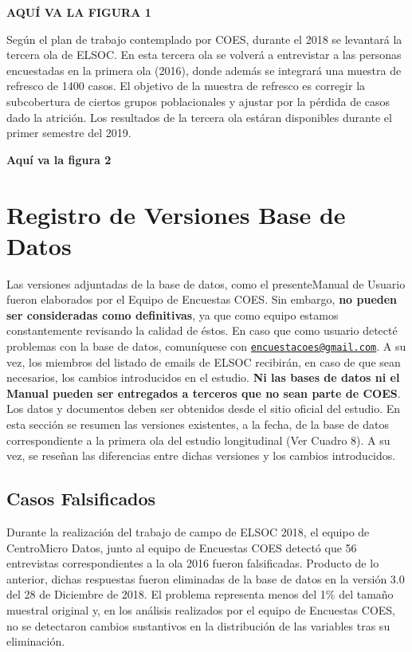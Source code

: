 \documentclass[
]{book}
\begin{document}
\textbf{AQUÍ VA LA FIGURA 1}

Según el plan de trabajo contemplado por COES, durante el 2018 se
levantará la tercera ola de ELSOC. En esta tercera ola se volverá a
entrevistar a las personas encuestadas en la primera ola (2016), donde
además se integrará una muestra de refresco de 1400 casos. El objetivo
de la muestra de refresco es corregir la subcobertura de ciertos grupos
poblacionales y ajustar por la pérdida de casos dado la atrición. Los
resultados de la tercera ola estáran disponibles durante el primer
semestre del 2019.

\textbf{Aquí va la figura 2}

\hypertarget{registro-de-versiones-base-de-datos}{%
\chapter{Registro de Versiones Base de
Datos}\label{registro-de-versiones-base-de-datos}}

Las versiones adjuntadas de la base de datos, como el presenteManual de
Usuario fueron elaborados por el Equipo de Encuestas COES. Sin embargo,
\textbf{no pueden ser consideradas como definitivas}, ya que como equipo
estamos constantemente revisando la calidad de éstos. En caso que como
usuario detecté problemas con la base de datos, comuníquese con
\href{mailto:encuestacoes@gmail.com}{\nolinkurl{encuestacoes@gmail.com}}.
A su vez, los miembros del listado de emails de ELSOC recibirán, en caso
de que sean necesarios, los cambios introducidos en el estudio.
\textbf{Ni las bases de datos ni el Manual pueden ser entregados a
terceros que no sean parte de COES}. Los datos y documentos deben ser
obtenidos desde el sitio oficial del estudio. En esta sección se resumen
las versiones existentes, a la fecha, de la base de datos
correspondiente a la primera ola del estudio longitudinal (Ver Cuadro
8). A su vez, se reseñan las diferencias entre dichas versiones y los
cambios introducidos.

\hypertarget{casos-falsificados}{%
\section{Casos Falsificados}\label{casos-falsificados}}

Durante la realización del trabajo de campo de ELSOC 2018, el equipo de
CentroMicro Datos, junto al equipo de Encuestas COES detectó que 56
entrevistas correspondientes a la ola 2016 fueron falsificadas. Producto
de lo anterior, dichas respuestas fueron eliminadas de la base de datos
en la versión 3.0 del 28 de Diciembre de 2018. El problema representa
menos del 1\% del tamaño muestral original y, en los análisis realizados
por el equipo de Encuestas COES, no se detectaron cambios sustantivos en
la distribución de las variables tras su eliminación.
\end{document}
